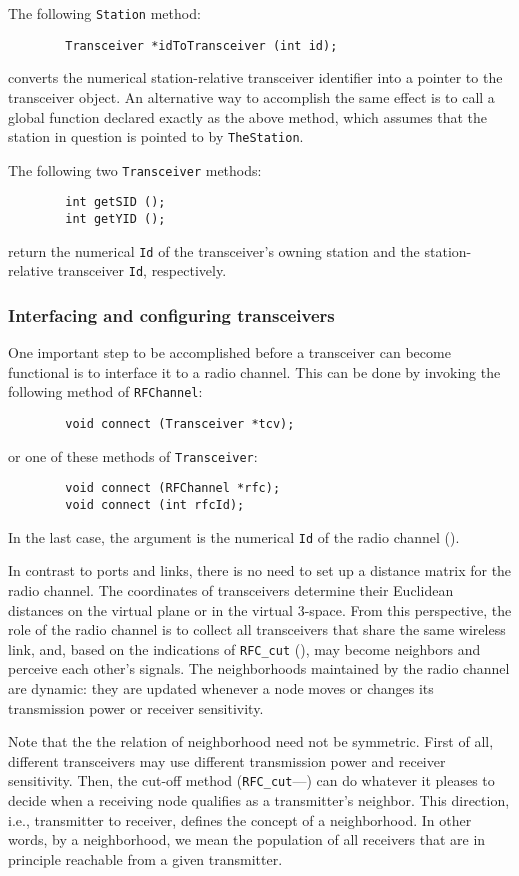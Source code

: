 The following {\tt Station} method:
\begin{verbatim}
        Transceiver *idToTransceiver (int id);
\end{verbatim}
converts the numerical station-relative transceiver identifier into
a pointer to the transceiver object.
An alternative way to accomplish the same effect
is to call a global function declared
exactly as the above method, which assumes that the station in question is
pointed to by {\tt TheStation}.

The following two {\tt Transceiver} methods:
\begin{verbatim}
        int getSID ();
        int getYID ();
\end{verbatim}
return the numerical {\tt Id} of the transceiver's owning station and the
station-relative transceiver {\tt Id}, respectively.

\subsubsection{Interfacing and configuring transceivers}
\label{rm_to_tr_if}

One important step to be accomplished before a transceiver can become
functional is to interface it to a radio channel.
This can be done by invoking the following method of {\tt RFChannel}:
\begin{verbatim}
        void connect (Transceiver *tcv);
\end{verbatim}
\noindent
or one of these methods of {\tt Transceiver}:
\begin{verbatim}
        void connect (RFChannel *rfc);
        void connect (int rfcId);
\end{verbatim}
\noindent
In the last case, the argument is the numerical {\tt Id} of the radio channel
().

In contrast to ports and links, there is no need to set up a distance matrix
for the radio channel.
The coordinates of transceivers determine their Euclidean distances on the
virtual plane or in the virtual 3-space.
From this perspective, the role of the radio channel is to collect
all transceivers that share the same wireless link, and, based
on the indications of {\tt RFC\_cut} (), may become
neighbors and perceive each other's signals.
The neighborhoods maintained by the radio channel are dynamic: they are updated
whenever a node moves or changes its transmission power or receiver
sensitivity.

Note that the the relation of neighborhood need not be symmetric.
First of all, different transceivers may use different transmission power
and receiver sensitivity.
Then, the cut-off method ({\tt RFC\_cut}---) can do whatever
it pleases to decide when a receiving node qualifies as a transmitter's
neighbor.
This direction, i.e., transmitter to receiver, defines the concept
of a neighborhood.
In other words, by a neighborhood, we mean the population of all receivers
that are in principle reachable from a given transmitter.

